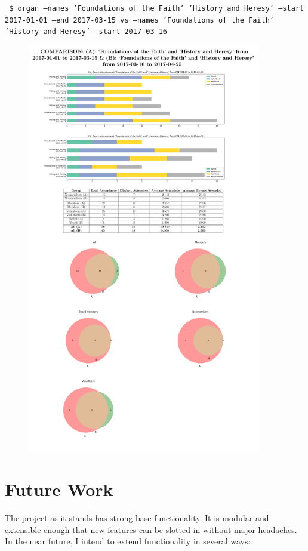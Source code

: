 \documentclass[12pt]{article}
\begin{document}
\texttt{ \$ organ --names 'Foundations of the Faith' 'History and Heresy' --start 2017-01-01 --end 2017-03-15 vs --names 'Foundations of the Faith' 'History and Heresy' --start 2017-03-16}
\begin{figure}[H]
    \centering
    \includegraphics[width=4in]{./media/selfcomp.pdf}
\end{figure}
\pagebreak


\section*{Future Work}
The project as it stands has strong base functionality.
It is modular and extensible enough that new features can be slotted in without major headaches.
In the near future, I intend to extend functionality in several ways:
\end{document}
